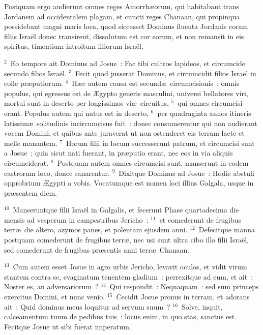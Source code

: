 \lettrine[lines=3,image=true,loversize=0.05,lraise=-0.03]{P}{}ostquam ergo audierunt omnes reges Amorrh\ae orum, qui habitabant trans Jordanem ad occidentalem plagam, et cuncti reges Chanaan, qui propinqua possidebant magni maris loca, quod siccasset Dominus fluenta Jordanis coram filiis Isra\"el donec transirent, dissolutum est cor eorum, et non remansit in eis spiritus, timentium introitum filiorum Isra\"el.


${}^{2}$~Eo tempore ait Dominus ad Josue~: Fac tibi cultros lapideos, et circumcide secundo filios Isra\"el.
${}^{3}$~Fecit quod jusserat Dominus, et circumcidit filios Isra\"el in colle pr\ae putiorum.
${}^{4}$~H\ae c autem causa est secund\ae\ circumcisionis~: omnis populus, qui egressus est de \AE gypto generis masculini, universi bellatores viri, mortui sunt in deserto per longissimos vi\ae\ circuitus,
${}^{5}$~qui omnes circumcisi erant. Populus autem qui natus est in deserto,
${}^{6}$~per quadraginta annos itineris latissim\ae\ solitudinis incircumcisus fuit~: donec consumerentur qui non audierant vocem Domini, et quibus ante juraverat ut non ostenderet eis terram lacte et melle manantem.
${}^{7}$~Horum filii in locum successerunt patrum, et circumcisi sunt a Josue~: quia sicut nati fuerant, in pr\ae putio erant, nec eos in via aliquis circumciderat.
${}^{8}$~Postquam autem omnes circumcisi sunt, manserunt in eodem castrorum loco, donec sanarentur.
${}^{9}$~Dixitque Dominus ad Josue~: Hodie abstuli opprobrium \AE gypti a vobis. Vocatumque est nomen loci illius Galgala, usque in pr\ae sentem diem.


${}^{10}$~Manseruntque filii Isra\"el in Galgalis, et fecerunt Phase quartadecima die mensis ad vesperum in campestribus Jericho~:
${}^{11}$~et comederunt de frugibus terr\ae\ die altero, azymos panes, et polentam ejusdem anni.
${}^{12}$~Defecitque manna postquam comederunt de frugibus terr\ae , nec usi sunt ultra cibo illo filii Isra\"el, sed comederunt de frugibus pr\ae sentis anni terr\ae\ Chanaan.


${}^{13}$~Cum autem esset Josue in agro urbis Jericho, levavit oculos, et vidit virum stantem contra se, evaginatum tenentem gladium~: perrexitque ad eum, et ait~: Noster es, an adversariorum~?
${}^{14}$~Qui respondit~: Nequaquam~: sed sum princeps exercitus Domini, et nunc venio.
${}^{15}$~Cecidit Josue pronus in terram, et adorans ait~: Quid dominus meus loquitur ad servum suum~?
${}^{16}$~Solve, inquit, calceamentum tuum de pedibus tuis~: locus enim, in quo stas, sanctus est. Fecitque Josue ut sibi fuerat imperatum.

